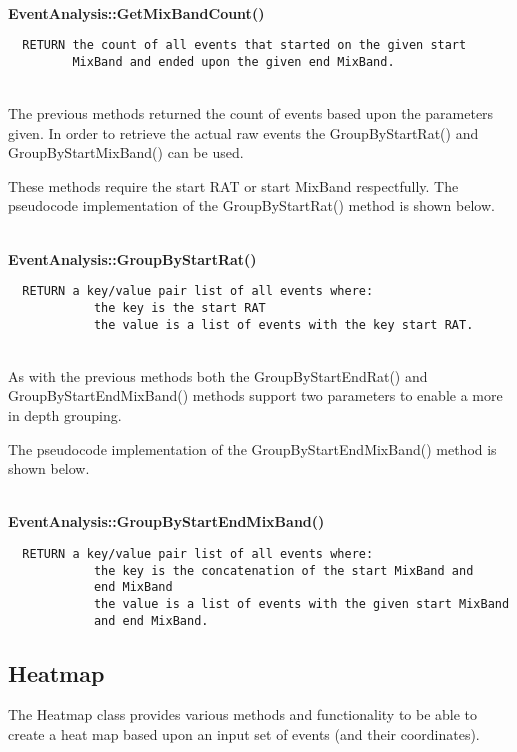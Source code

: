~\\
{\bfseries EventAnalysis::GetMixBandCount()}
\lstset{style=pseudocode}
\begin{lstlisting}
  RETURN the count of all events that started on the given start 
         MixBand and ended upon the given end MixBand.
\end{lstlisting}

~\\
The previous methods returned the count of events based upon the parameters 
given. In order to retrieve the actual raw events the 
{\ttfamily GroupByStartRat()} and {\ttfamily GroupByStartMixBand()} can be 
used. 

These methods require the start RAT or start MixBand respectfully. The 
pseudocode implementation of the {\ttfamily GroupByStartRat()} method is shown 
below.

~\\
{\bfseries EventAnalysis::GroupByStartRat()}
\lstset{style=pseudocode}
\begin{lstlisting}
  RETURN a key/value pair list of all events where:
            the key is the start RAT 
            the value is a list of events with the key start RAT.
\end{lstlisting}

~\\
As with the previous methods both the {\ttfamily GroupByStartEndRat()} and 
{\ttfamily GroupByStartEndMixBand()} methods support two parameters to enable
a more in depth grouping.

The pseudocode implementation of the {\ttfamily GroupByStartEndMixBand()} 
method is shown below.

~\\
{\bfseries EventAnalysis::GroupByStartEndMixBand()}
\lstset{style=pseudocode}
\begin{lstlisting}
  RETURN a key/value pair list of all events where:
            the key is the concatenation of the start MixBand and 
            end MixBand
            the value is a list of events with the given start MixBand 
            and end MixBand.
\end{lstlisting}


\subsection{Heatmap}
The Heatmap class provides various methods and functionality to be able to 
create a heat map based upon an input set of events (and their coordinates).

